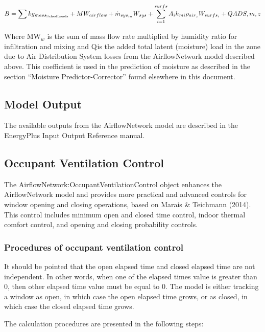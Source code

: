 \begin{equation}
B = \sum {k{g_{mas{s_{{\rm{Sched Loads}}}}}}}  + M{W_{airflow}} + {\dot m_{sy{s_{in}}}}{W_{sys}} + \sum\limits_{i = 1}^{surfs} {{A_i}{h_{mi}}{\rho_{ai{r_z}}}{W_{surf{s_i}}}}  + QADS,m,z
\end{equation}

Where MW\(_{w}\) is the sum of mass flow rate multiplied by humidity ratio for infiltration and mixing and Q\(_{ }\)is the added total latent (moisture) load in the zone due to Air Distribution System losses from the AirflowNetwork model described above. This coefficient is used in the prediction of moisture as described in the section ``Moisture Predictor-Corrector'' found elsewhere in this document.

\subsection{Model Output}\label{model-output}

The available outputs from the AirflowNetwork model are described in the EnergyPlus Input Output Reference manual.

\subsection{Occupant Ventilation Control}\label{occupant-ventilation-control}

The AirflowNetwork:OccupantVentilationControl object enhances the AirflowNetwork model and provides more practical and advanced controls for window opening and closing operations, based on Marais \& Teichmann (2014). This control includes minimum open and closed time control, indoor thermal comfort control, and opening and closing probability controls.

\subsubsection{Procedures of occupant ventilation control}\label{procedures-of-occupant-ventilation-control}

It should be pointed that the open elapsed time and closed elapsed time are not independent. In other words, when one of the elapsed times value is greater than 0, then other elapsed time value must be equal to 0. The model is either tracking a window as open, in which case the open elapsed time grows, or as closed, in which case the closed elapsed time grows.

The calculation procedures are presented in the following steps:

